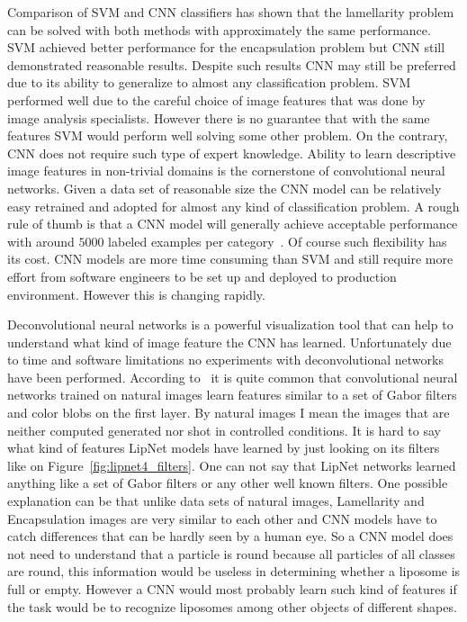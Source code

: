 \documentclass[a4paper, 11pt, table]{article}
\begin{document}
Comparison of SVM and CNN classifiers has shown that the lamellarity problem can be solved with both methods with approximately the same performance. SVM achieved better performance for the encapsulation problem but CNN still demonstrated reasonable results. Despite such results CNN may still be preferred due to its ability to generalize to almost any classification problem. SVM performed well due to the careful choice of image features that was done by image analysis specialists. However there is no guarantee that with the same features SVM would perform well solving some other problem. On the contrary, CNN does not require such type of expert knowledge. Ability to learn descriptive image features in non-trivial domains is the cornerstone of convolutional neural networks. Given a data set of reasonable size the CNN model can be relatively easy retrained and adopted for almost any kind of classification problem. A rough rule of thumb is that a CNN model will generally achieve acceptable performance with around $5000$ labeled examples per category~\cite{dl_book}. Of course such flexibility has its cost. CNN models are more time consuming than SVM and still require more effort from software engineers to be set up and deployed to production environment. However this is changing rapidly. 

Deconvolutional neural networks is a powerful visualization tool that can help to understand what kind of image feature the CNN has learned. Unfortunately due to time and software limitations no experiments with deconvolutional networks have been performed. According to~\cite{DBLP:journals/corr/YosinskiCBL14} it is quite common that convolutional neural networks trained on natural images learn features similar to a set of Gabor filters and color blobs on the first layer. By natural images I mean the images that are neither computed generated nor shot in controlled conditions. It is hard to say what kind of features LipNet models have learned by just looking on its filters like on Figure~\ref{fig:lipnet4_filters}. One can not say that LipNet networks learned anything like a set of Gabor filters or any other well known filters. One possible explanation can be that unlike data sets of natural images, Lamellarity and Encapsulation images are very similar to each other and CNN models have to catch differences that can be hardly seen by a human eye. So a CNN model does not need to understand that a particle is round because all particles of all classes are round, this information would be useless in determining whether a liposome is full or empty. However a CNN would most probably learn such kind of features if the task would be to recognize liposomes among other objects of different shapes. 
\end{document}
